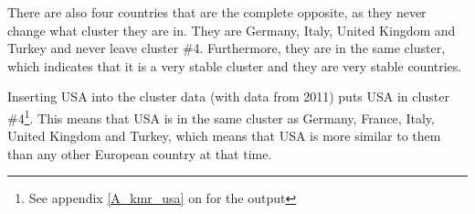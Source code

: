 There are also four countries that are the complete opposite, as they never change what cluster they are in. They are Germany, Italy, United Kingdom and Turkey and never leave cluster \#4. Furthermore, they are in the same cluster, which indicates that it is a very stable cluster and they are very stable countries.

Inserting USA into the cluster data (with data from 2011) puts USA in cluster \#4\footnote{See appendix \ref{A_kmr_usa} on \pageref{A_kmr_usa} for the output}. This means that USA is in the same cluster as Germany, France, Italy, United Kingdom and Turkey, which means that USA is more similar to them than any other European country at that time.